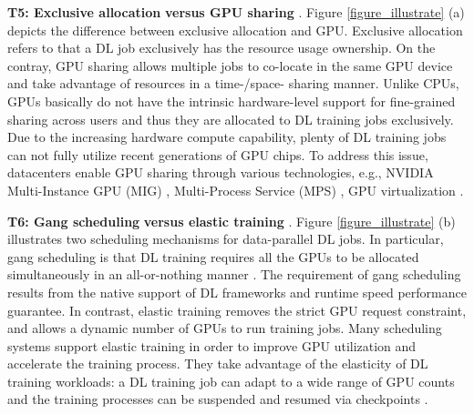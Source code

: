 \textbf{T5: Exclusive allocation} \cite{Helios} \textbf{versus GPU sharing} \cite{MLaaS}. Figure \ref{figure_illustrate} (a) depicts the difference between exclusive allocation and GPU. Exclusive allocation refers to that a DL job exclusively has the resource usage ownership. On the contray, GPU sharing allows multiple jobs to co-locate in the same GPU device and take advantage of resources in a time-/space- sharing manner. Unlike CPUs, GPUs basically do not have the intrinsic hardware-level support for fine-grained sharing across users and thus they are allocated to DL training jobs exclusively. Due to the increasing hardware compute capability, plenty of DL training jobs can not fully utilize recent generations of GPU chips. To address this issue, datacenters enable GPU sharing through various technologies, e.g., NVIDIA Multi-Instance GPU (MIG) \cite{mig}, Multi-Process Service (MPS) \cite{mps}, GPU virtualization \cite{SurvGPUVirtual}.


\textbf{T6: Gang scheduling} \cite{Helios} \textbf{versus elastic training} \cite{Pollux}. Figure \ref{figure_illustrate} (b) illustrates two scheduling mechanisms for data-parallel DL jobs. In particular, gang scheduling is that DL training requires all the GPUs to be allocated simultaneously in an all-or-nothing manner \cite{gang}. The requirement of gang scheduling results from the native support of DL frameworks and runtime speed performance guarantee. In contrast, elastic training removes the strict GPU request constraint, and allows a dynamic number of GPUs to run training jobs. Many scheduling systems support elastic training in order to improve GPU utilization and accelerate the training process. They take advantage of the elasticity of DL training workloads: a DL training job can adapt to a wide range of GPU counts and the training processes can be suspended and resumed via checkpoints \cite{Helios}.



